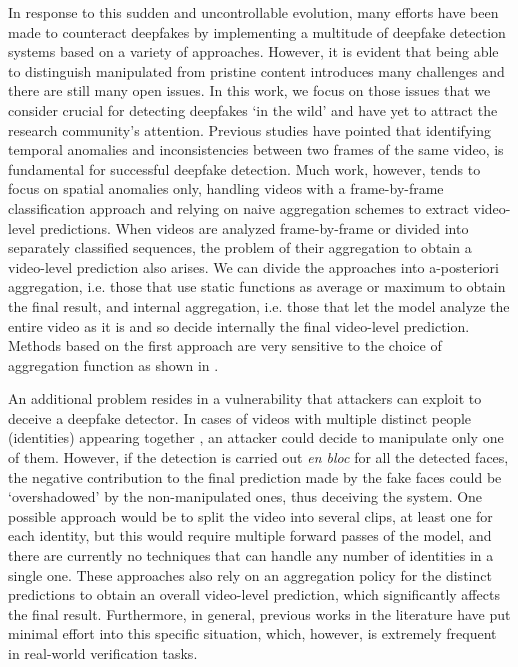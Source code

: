 \documentclass[10pt,twocolumn,letterpaper]{article}
\begin{document}
In response to this sudden and uncontrollable evolution, many efforts have been made to counteract deepfakes by implementing a multitude of deepfake detection systems 
based on a variety of approaches. 
However, it is evident that being able to distinguish manipulated from pristine content introduces many challenges and there are still many open issues. In this work, we focus on those issues that we consider crucial for detecting deepfakes `in the wild' and have yet to attract the research community's attention.
Previous studies \cite{ftcn, realforensics,meverdeepfake} have pointed that identifying temporal anomalies and inconsistencies between two frames of the same video, is fundamental for successful deepfake detection. Much work, however, tends to focus on spatial anomalies only, handling videos with a frame-by-frame classification approach and relying on naive aggregation schemes to extract video-level predictions\cite{mesonet,Bayar2016ADL,10.1145/3549555.3549588, 10.1145/3512732.3533582}.
When videos are analyzed frame-by-frame or divided into separately classified sequences, the problem of their aggregation to obtain a video-level prediction also arises. We can divide the approaches into a-posteriori aggregation, i.e. those that use static functions as average or maximum to obtain the final result, and internal aggregation, i.e. those that let the model analyze the entire video as it is and so decide internally the final video-level prediction. Methods based on the first approach are very sensitive to the choice of aggregation function as shown in \cite{preprocessing, meverdeepfake}.

An additional problem resides in a vulnerability that attackers can exploit to deceive a deepfake detector. In cases of videos with multiple distinct people (identities) appearing together \cite{Le2021OpenForensicsLC}, an attacker could decide to manipulate only one of them. However, if the detection is carried out \emph{en bloc} for all the detected faces, the negative contribution to the final prediction made by the fake faces could be `overshadowed' by the non-manipulated ones, thus deceiving the system. One possible approach would be to split the video into several clips, at least one for each identity, but this would require multiple forward passes of the model, and there are currently no techniques that can handle any number of identities in a single one. These approaches also rely on an aggregation policy for the distinct predictions to obtain an overall video-level prediction, which significantly affects the final result. Furthermore, in general, previous works in the literature have put minimal effort into this specific situation, which, however, is extremely frequent in real-world verification tasks.
\end{document}

